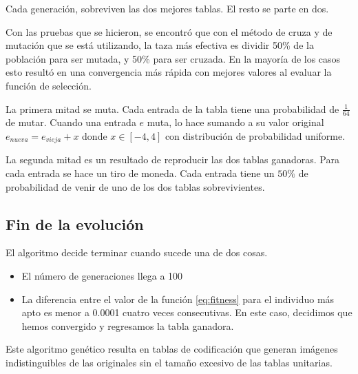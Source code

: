 Cada generación, sobreviven las dos mejores tablas. El resto se parte en dos.

Con las pruebas que se hicieron, se encontró que con el método de cruza y de
mutación que se está utilizando, la taza más efectiva es dividir 50\% de la
población para ser mutada, y 50\% para ser cruzada. En la mayoría de los casos
esto resultó en una convergencia más rápida con mejores valores al evaluar la
función de selección.

La primera mitad se muta. Cada entrada de la tabla tiene una probabilidad de
$\frac{1}{64}$ de mutar. Cuando una entrada $e$ muta, lo hace sumando a su
valor original
$e_{nueva} = e_{vieja} + x $ donde $x \in [-4, 4]$ con distribución de
probabilidad uniforme.

La segunda mitad es un resultado de reproducir las dos tablas ganadoras. Para
cada entrada se hace un tiro de moneda. Cada entrada tiene un $50\%$ de
probabilidad de venir de uno de los dos tablas sobrevivientes.

\subsection {Fin de la evolución}

El algoritmo decide terminar cuando sucede una de dos cosas.

\begin{itemize}
\item El número de generaciones llega a 100
\item La diferencia entre el valor de la función \ref{eq:fitness} para el
individuo más apto es menor a 0.0001 cuatro veces consecutivas. En este caso,
decidimos que hemos convergido y regresamos la tabla ganadora.
\end{itemize}

Este algoritmo genético resulta en tablas de codificación que generan imágenes
indistinguibles de las originales sin el tamaño excesivo de las tablas
unitarias.
